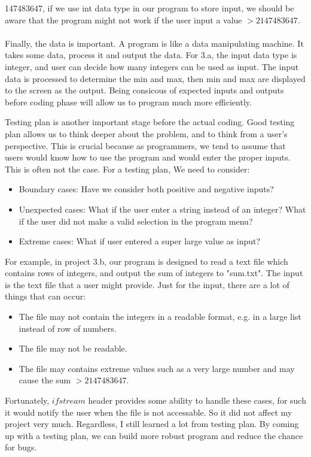 \documentclass[11pt]{article}
\newenvironment{exercise}[2]{\begin{trivlist}
\item[\hskip \labelsep {\bfseries #1}\hskip \labelsep {\bfseries #2.}]}{\end{trivlist}}
\begin{document}
\begin{exercise}{Understanding}
2147483647, if we use int data type in our program to store input,
we should be aware that the program might not work
if the user input a value $> 2147483647$.\\
\\
Finally, the data is important. A program is like a data manipulating
machine. It takes some data, process it and output the data. For 3.a, the input
data type is integer, and user can decide how many integers can be used as input.
The input data is processed to determine the min and max, then min and max
are displayed to the screen as the output. Being consicous of expected inputs
and outputs before coding phase will allow us to program much more efficiently.
\end{exercise}

\begin{exercise}{Testing plan}\\
Testing plan is another important stage before the actual coding. Good testing
plan allows us to think deeper about the problem, and to think from a user's
perspective. This is crucial because as programmers, we tend to assume that
users would know how to use the program and would enter the proper inputs.
This is often not the case. For a testing plan, We need to consider:

\begin{itemize}
\item {Boundary cases}: Have we consider both positive and negative inputs?
\item {Unexpected cases}: What if the user enter a string instead of an integer?
What if the user did not make a valid selection in the program menu?
\item {Extreme cases}: What if user entered a super large value as input?
\end{itemize}

For example, in project 3.b, our program is designed to read a text file
which contains rows of integers, and output the sum of integers to "sum.txt".
The input is the text file that a user might provide. Just for the input,
there are a lot of things that can occur:

\begin{itemize}
\item The file may not contain the integers in a readable format,
e.g. in a large list instead of row of numbers.
\item The file may not be readable.
\item The file may contains extreme values such as a very large number and may
cause the sum $> 2147483647$.
\end{itemize}
Fortunately, $ifstream$ header provides some ability to handle these cases,
for such it would notify the user when the file is not accessable. So it did not
affect my project very much. Regardless, I still learned a lot from testing plan.
By coming up with a testing plan, we can build more robust program and
reduce the chance for bugs.
\end{exercise}
\end{document}
